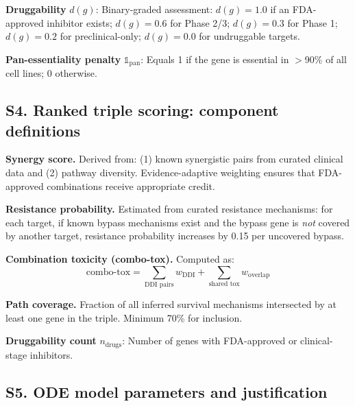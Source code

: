 \documentclass[11pt]{article}
\begin{document}
\textbf{Druggability} $d(g)$: Binary-graded assessment: $d(g) = 1.0$ if an FDA-approved inhibitor exists; $d(g) = 0.6$ for Phase 2/3; $d(g) = 0.3$ for Phase 1; $d(g) = 0.2$ for preclinical-only; $d(g) = 0.0$ for undruggable targets.

\textbf{Pan-essentiality penalty} $\mathbb{1}_{\text{pan}}$: Equals 1 if the gene is essential in $>$90\% of all cell lines; 0 otherwise.

\subsection{S4. Ranked triple scoring: component definitions}

\textbf{Synergy score.} Derived from: (1) known synergistic pairs from curated clinical data and (2) pathway diversity. Evidence-adaptive weighting ensures that FDA-approved combinations receive appropriate credit.

\textbf{Resistance probability.} Estimated from curated resistance mechanisms: for each target, if known bypass mechanisms exist and the bypass gene is \emph{not} covered by another target, resistance probability increases by 0.15 per uncovered bypass.

\textbf{Combination toxicity (combo-tox).} Computed as:
\[
\text{combo-tox} = \sum_{\text{DDI pairs}} w_{\text{DDI}} + \sum_{\text{shared tox}} w_{\text{overlap}}
\]

\textbf{Path coverage.} Fraction of all inferred survival mechanisms intersected by at least one gene in the triple. Minimum 70\% for inclusion.

\textbf{Druggability count} $n_{\text{drugs}}$: Number of genes with FDA-approved or clinical-stage inhibitors.

\subsection{S5. ODE model parameters and justification}
\end{document}
